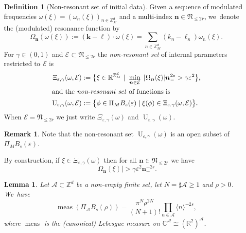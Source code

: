 \documentclass[10pt,a4paper]{amsart}
\theoremstyle{plain}
\newtheorem{lemma}[theorem]{Lemma}
\theoremstyle{definition}
\newtheorem{definition}[theorem]{Definition}
\newtheorem{remark}[theorem]{Remark}
\DeclareMathOperator{\meas}{meas}
\newcommand{\nb}{{\boldsymbol n}}
\newcommand{\kb}{{\boldsymbol k}}
\newcommand{\lb}{{\boldsymbol \ell}}
\newcommand{\Nb}{{\boldsymbol{\mathfrak{N}}}}
\newcommand{\Z}{\mathbb{Z}}
\newcommand{\R}{\mathbb{R}}
\newcommand{\C}{\mathbb{C}}
\newcommand{\1}{\mathbf{1}}
\let\epsilon\varepsilon
\begin{document}
\begin{definition}[Non-resonant set of initial data]
\label{def:non-res}Given a sequence of modulated frequencies $\omega(\xi)=(\omega_n(\xi))_{n\in\Z_{M}^{d}}$
and a multi-index $\nb\in\Nb_{\leq2\overline{r}}$, we~denote the (modulated) resonance function by
\[
\Omega_\nb(\omega(\xi)) := (\kb-\lb)\cdot\omega(\xi) = \sum_{n\in\Z_{M}^{d}}(k_n- \ell_n)\omega_n(\xi).
\]
For $\gamma\in(0,1)$ and $\mathcal{E}\subset \Nb_{\leq2\overline{r}}$ the \emph{non-resonant set} of internal parameters restricted to $\mathcal{E}$ is
\begin{align}
\label{eq:gmdst}
\Xi_{\epsilon,\gamma}(\omega,\mathcal{E})
&:= \big\{\xi\in \R^{\Z_{M}^{d}}\
|\ \min_{\nb\in\mathcal{E}}\ |\Omega_\nb(\xi)|
\nb_-^{2s}>\gamma\epsilon^2\big\},\\
\intertext{and the \emph{non-resonant set} of functions is}
\label{eq:theta-set}
\operatorname{U}_{\epsilon,\gamma}(\omega,\mathcal{E})&:=\big\{\phi\in\Pi_{M}B_{s}(\epsilon)\mid \xi(\phi)\in\Xi_{\epsilon,\gamma}(\omega,\mathcal{E})\big\}.
\end{align}
When $\mathcal{E}=\Nb_{\leq2\overline{r}}$ we just write $\Xi_{\epsilon,\gamma}(\omega)$ and $\operatorname{U}_{\epsilon,\gamma}(\omega)$.
\end{definition}
\begin{remark}
Note that the non-resonant set $\operatorname{U}_{\epsilon,\gamma}(\omega)$ is an open subset of $\Pi_{M}B_{s}(\epsilon)$.
\end{remark}
By construction, if $\xi\in\Xi_{\epsilon,\gamma}(\omega)$ then for all $\nb\in\Nb_{\leq2\overline{r}}$ we have
\[
|\Omega_{\nb}(\xi)| >\gamma\epsilon^2\nb_{-}^{-2s}.
\]

\begin{lemma}\label{lem:meas-ball} Let $\mathcal{A}\subset{\Z}^{d}$ be a non-empty finite set, let $N=\sharp\mathcal{A}\geq1$ and $\rho>0$. We~have
\[
\meas(\Pi_{\mathcal{A}}B_{s}(\rho)) = \frac{\pi^{N}\rho^{2N}}{(N+1)!}\prod_{n\in\mathcal{A}}\langle n\rangle^{-2s},
\]
where $\meas$ is the (canonical) Lebesgue measure on $\C^{\mathcal{A}}\cong (\R^{2})^{\mathcal{A}} $.
\end{lemma}
\end{document}
